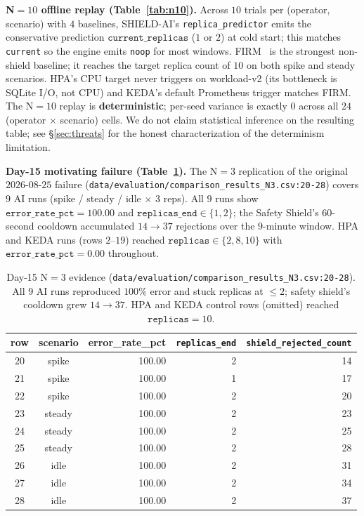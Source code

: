 \documentclass[conference,10pt]{IEEEtran}
\begin{document}
\textbf{N$=10$ offline replay (Table~\ref{tab:n10}).} Across $10$
trials per (operator, scenario) with $4$ baselines, SHIELD-AI's
\texttt{replica\_predictor} emits the conservative prediction
$\texttt{current\_replicas}$ ($1$ or $2$) at cold start; this
matches \texttt{current} so the engine emits \texttt{noop} for most
windows. FIRM~\cite{lim_firm_2020} is the strongest non-shield
baseline; it reaches the target replica count of $10$ on both
spike and steady scenarios. HPA's CPU target never triggers on
workload-v2 (its bottleneck is SQLite I/O, not CPU) and KEDA's
default Prometheus trigger matches FIRM. The N$=10$ replay is
\textbf{deterministic}; per-seed variance is exactly $0$ across all
$24$ (operator $\times$ scenario) cells. We do not claim statistical
inference on the resulting table; see \S\ref{sec:threats} for the
honest characterization of the determinism limitation.

\textbf{Day-15 motivating failure (Table~\ref{tab:day15}).}
The N$=3$ replication of the original $2026$-$08$-$25$ failure
(\texttt{data/evaluation/comparison\_results\_N3.csv:20-28})
covers $9$ AI runs (spike / steady / idle $\times$ 3 reps). All $9$
runs show $\texttt{error\_rate\_pct} = 100.00$ and
$\texttt{replicas\_end} \in \{1, 2\}$; the Safety Shield's $60$-second
cooldown accumulated $14 \to 37$ rejections over the $9$-minute
window. HPA and KEDA runs (rows $2$--$19$) reached $\texttt{replicas}
\in \{2, 8, 10\}$ with $\texttt{error\_rate\_pct} = 0.00$ throughout.

\begin{table}[!t]
  \centering
  \caption{Day-15 N$=3$ evidence (\texttt{data/evaluation/comparison\_results\_N3.csv:20-28}). All $9$ AI runs reproduced $100\%$ error and stuck replicas at $\le 2$; safety shield's cooldown grew $14 \to 37$. HPA and KEDA control rows (omitted) reached $\texttt{replicas}=10$.}
  \label{tab:day15}
  \footnotesize
  \begin{tabular}{ccrrr}
    \toprule
    \textbf{row} & \textbf{scenario} & \textbf{error\_rate\_pct} & \texttt{replicas\_end} & \texttt{shield\_rejected\_count} \\
    \midrule
    20 & spike  & 100.00 & 2 & 14 \\
    21 & spike  & 100.00 & 1 & 17 \\
    22 & spike  & 100.00 & 2 & 20 \\
    23 & steady & 100.00 & 2 & 23 \\
    24 & steady & 100.00 & 2 & 25 \\
    25 & steady & 100.00 & 2 & 28 \\
    26 & idle   & 100.00 & 2 & 31 \\
    27 & idle   & 100.00 & 2 & 34 \\
    28 & idle   & 100.00 & 2 & 37 \\
    \bottomrule
  \end{tabular}
\end{table}
\end{document}
